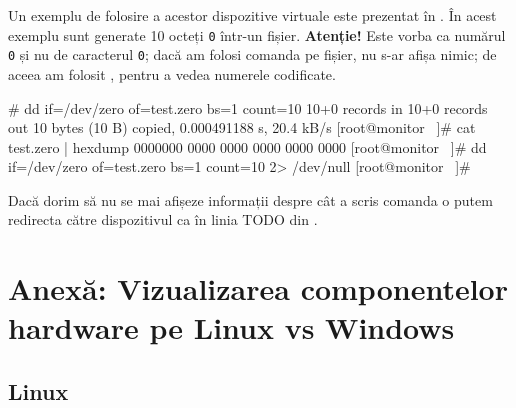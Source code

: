 Un exemplu de folosire a acestor dispozitive virtuale este prezentat în . În acest exemplu sunt generate 10 octeți \texttt{0} într-un fișier. \textbf{Atenție!} Este vorba ca numărul \texttt{0} și nu de caracterul \texttt{0}; dacă am folosi comanda  pe fișier, nu s-ar afișa nimic; de aceea am folosit
, pentru a vedea numerele codificate.

\begin{screen}# dd if=/dev/zero of=test.zero bs=1 count=10
10+0 records in
10+0 records out
10 bytes (10 B) copied, 0.000491188 s, 20.4 kB/s
[root@monitor ~]# cat test.zero | hexdump
0000000 0000 0000 0000 0000 0000
[root@monitor ~]# dd if=/dev/zero of=test.zero bs=1 count=10 2> /dev/null
[root@monitor ~]#
\end{screen}

Dacă dorim să nu se mai afișeze informații despre cât a
scris comanda  o putem redirecta către dispozitivul  ca în linia TODO din .

\section{Anexă: Vizualizarea componentelor hardware pe Linux vs Windows}
\label{sec:hardware-virtualizare}

\subsection{Linux}
\label{sec:hardware-virtualizare-linux}

